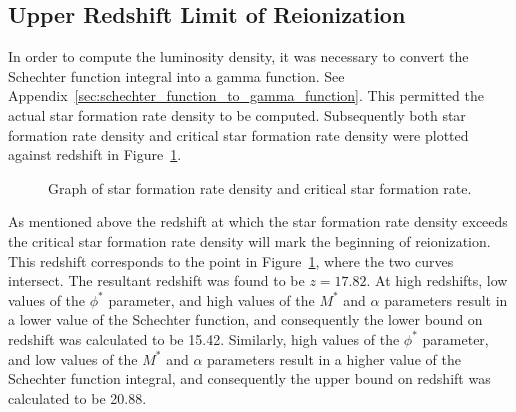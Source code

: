		\subsection{Upper Redshift Limit of Reionization} %
		\label{sub:upper_redshift_limit_of_reionization}
			In order to compute the luminosity density, it was necessary to convert the Schechter function integral into a gamma function. See Appendix~\ref{sec:schechter_function_to_gamma_function}. This permitted the actual star formation rate density to be computed. Subsequently both star formation rate density and critical star formation rate density were plotted against redshift in Figure~\ref{fig:GRAPH_SFR_CriticalSFR}.
			\begin{figure}[htbp]
				\centering
					\begingroup{}
						\resizebox{0.8\textwidth}{!}{%
							
						}\endgroup
				\caption{Graph of star formation rate density and critical star formation rate.\label{fig:GRAPH_SFR_CriticalSFR}}
			\end{figure}

			As mentioned above the redshift at which the star formation rate density exceeds the critical star formation rate density will mark the beginning of reionization. This redshift corresponds to the point in Figure~\ref{fig:GRAPH_SFR_CriticalSFR}, where the two curves intersect. The resultant redshift was found to be $z = 17.82$. At high redshifts, low values of the $\phi^*$ parameter, and high values of the $M^*$ and $\alpha$ parameters result in a lower value of the Schechter function, and consequently the lower bound on redshift was calculated to be 15.42. Similarly, high values of the $\phi^*$ parameter, and low values of the $M^*$ and $\alpha$ parameters result in a higher value of the Schechter function integral, and consequently the upper bound on redshift was calculated to be 20.88.
